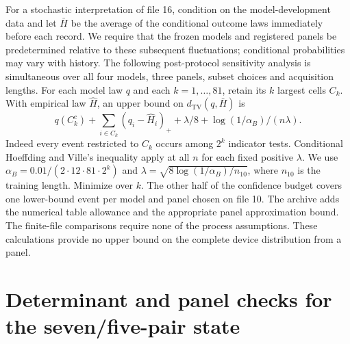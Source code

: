 \documentclass[11pt]{article}
\newcommand{\TV}{d_{\mathrm{TV}}}
\begin{document}
For a stochastic interpretation of file 16, condition on the model-development data and let $\bar H$ be the average of the conditional outcome laws immediately before each record. We require that the frozen models and registered panels be predetermined relative to these subsequent fluctuations; conditional probabilities may vary with history. The following post-protocol sensitivity analysis is simultaneous over all four models, three panels, subset choices and acquisition lengths. For each model law $q$ and each $k=1,\ldots,81$, retain its $k$ largest cells $C_k$. With empirical law $\hat H$, an upper bound on $\TV(q,\bar H)$ is
\[
 q(C_k^c)+\sum_{i\in C_k}(q_i-\hat H_i)_+ + \lambda/8+
                 \log(1/\alpha_B)/(n\lambda).
\]
Indeed every event restricted to $C_k$ occurs among $2^k$ indicator tests. Conditional Hoeffding and Ville's inequality \cite{ville} apply at all $n$ for each fixed positive $\lambda$. We use $\alpha_B=0.01/(2\cdot12\cdot81\cdot2^k)$ and $\lambda=\sqrt{8\log(1/\alpha_B)/n_{10}}$, where $n_{10}$ is the training length. Minimize over $k$. The other half of the confidence budget covers one lower-bound event per model and panel chosen on file 10. The archive adds the numerical table allowance and the appropriate panel approximation bound. The finite-file comparisons require none of the process assumptions. These calculations provide no upper bound on the complete device distribution from a panel.

\section{Determinant and panel checks for the seven/five-pair state}
\end{document}
